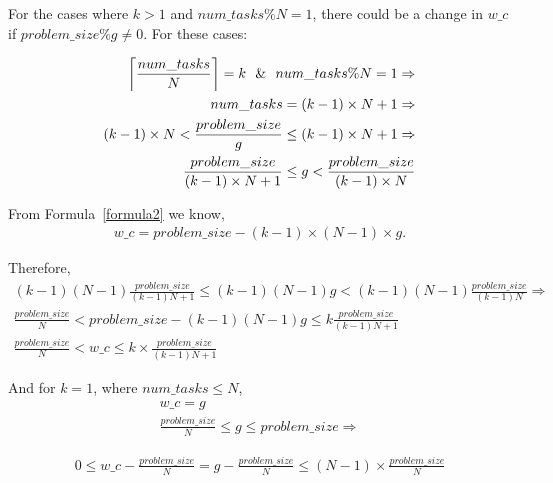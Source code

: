 For the cases where $k>1$ and $num\_{tasks}\%{N}={1}$, there could be a  change in $w\_c$ if $problem\_{size}\%{g}\neq{0}$. For these cases:


\begin{equation}\label{formula15}
\begin{aligned}
\left \lceil{\frac{num\_{tasks}}{N}}\right \rceil=k \text{\:\:\:}\&\text{\:\:\:} num\_{tasks}\%{N}={1}\Rightarrow\\
num\_{tasks}=(k-1)\times{N}+1\Rightarrow\\
(k-1)\times{N}<{\frac{problem\_{size}}{g}}\leq(k-1)\times{N}+1\Rightarrow\\
\frac{problem\_{size}}{(k-1)\times{N}+1}\leq{g}<\frac{problem\_{size}}{(k-1)\times{N}}
\end{aligned}
\end{equation}

From Formula~\ref{formula2} we know,
\begin{equation}\label{formula17}
\begin{aligned}
w\_c={problem\_{size}}-(k-1)\times(N-1)\times{g}.
\end{aligned}
\end{equation}

Therefore,
\begin{equation}\label{formula18}
\begin{aligned}
(k-1)(N-1)\frac{problem\_{size}}{(k-1){N}+1}\leq{(k-1)(N-1){g}}<(k-1)(N-1)\frac{problem\_{size}}{(k-1){N}}\Rightarrow\\
{\frac{problem\_{size}}{N}}<{problem\_{size}-{(k-1)(N-1){g}}}\leq{k\frac{problem\_{size}}{(k-1){N}+1}}\\
{\frac{problem\_{size}}{N}}<{w\_{c}}\leq{k\times\frac{problem\_{size}}{(k-1){N}+1}}
\end{aligned}
\end{equation}

And for $k=1$, where $num\_{tasks}\leq{N}$,
\begin{align*}\label{formula12}
w\_c=g\\
\frac{problem\_{size}}{N}\leq{g}\leq{problem\_{size}}\Rightarrow
\end{align*}

\begin{equation}\label{formula14}
\begin{aligned}
0\leq{w\_c-\frac{problem\_{size}}{N}}={g-\frac{problem\_{size}}{N}}\leq(N-1)\times{\frac{problem\_{size}}{N}}\\
\end{aligned}
\end{equation}


